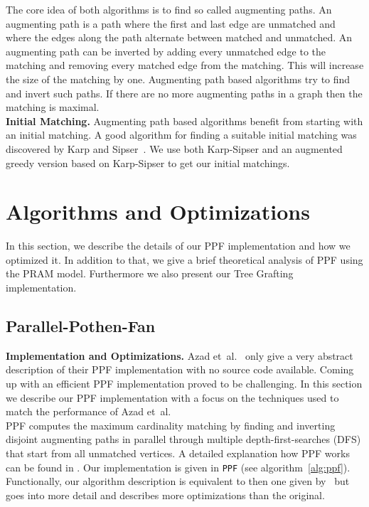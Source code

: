 \documentclass[letterpaper]{article}
\newcommand{\mypar}[1]{{\bf #1.}}
\begin{document}
The core idea of both algorithms is to find so called augmenting paths. An augmenting path is a path where the first 
and last edge are unmatched and where the edges along the path alternate between matched and unmatched. 
An augmenting path can be inverted by adding every unmatched edge to the matching and removing every matched edge from the matching. 
This will increase the size of the matching by one. 
Augmenting path based algorithms try to find and invert such paths. If there are no more augmenting paths in a graph then the matching is maximal.\\

\mypar{Initial Matching}
Augmenting path based algorithms benefit from starting with an initial matching. 
A good algorithm for finding a suitable initial matching was discovered by Karp and Sipser~\cite{KarpS81}.
We use both Karp-Sipser and an augmented greedy version based on Karp-Sipser to get our initial matchings. 

\section{Algorithms and Optimizations}\label{sec:pfopt}

In this section, we describe the details of our PPF implementation and how we optimized it. In addition to that, we 
give a brief theoretical analysis of PPF using the PRAM model. Furthermore we also present our Tree Grafting implementation.

\subsection{Parallel-Pothen-Fan}\label{sec:pf}

\mypar{Implementation and Optimizations} Azad et\ al.~\cite{Azad:2012} only give a very abstract description of their PPF implementation with no source code available. 
Coming up with an efficient PPF implementation proved to be challenging. 
In this section we describe our PPF implementation with a focus on the techniques used to match the performance of Azad et\ al.\\

PPF computes the maximum cardinality matching by finding and inverting disjoint augmenting paths in parallel through multiple depth-first-searches (DFS)
that start from all unmatched vertices. A detailed explanation how PPF works can be found in \cite{Azad:2012}. 
Our implementation is given in \texttt{PPF} (see algorithm~\ref{alg:ppf}). 
Functionally, our algorithm description is equivalent to then one given by~\cite{Azad:2012} 
but goes into more detail and describes more optimizations than the original.\\
\end{document}

